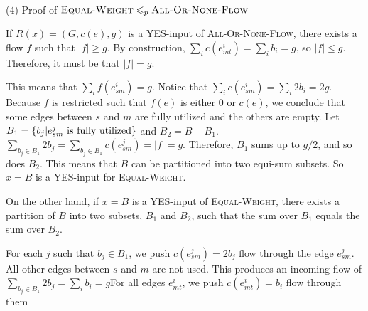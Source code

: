 \documentclass{article}
\begin{document}
~

\noindent(4) Proof of $\textsc{Equal-Weight}\leqslant_p\textsc{All-Or-None-Flow}$

If $R(x)=(G,c(e),g)$ is a YES-input of \textsc{All-Or-None-Flow}, there exists a flow $f$ such that $|f|\geqslant g$. By construction, $\sum_ic(e_{mt}^i)=\sum_ib_i=g$, so $|f|\leqslant g$. Therefore, it must be that $|f|=g$.

This means that $\sum_if(e_{sm}^i)=g$. Notice that $\sum_ic(e_{sm}^i)=\sum_i2b_i=2g$. Because $f$ is restricted such that $f(e)$ is either 0 or $c(e)$, we conclude that some edges between $s$ and $m$ are fully utilized and the others are empty. Let $B_1=\{b_j|e_{sm}^j\textup{ is fully utilized}\}$ and $B_2=B-B_1$. $\sum_{b_j\in B_1}2b_j=\sum_{b_j\in B_1}c(e_{sm}^j)=|f|=g$. Therefore, $B_1$ sums up to $g/2$, and so does $B_2$. This means that $B$ can be partitioned into two equi-sum subsets. So $x=B$ is a YES-input for \textsc{Equal-Weight}.

On the other hand, if $x=B$ is a YES-input of \textsc{Equal-Weight}, there exists a partition of $B$ into two subsets, $B_1$ and $B_2$, such that the sum over $B_1$ equals the sum over $B_2$.

For each $j$ such that $b_j\in B_1$, we push $c(e_{sm}^j)=2b_j$ flow through the edge $e_{sm}^j$. All other edges between $s$ and $m$ are not used. This produces an incoming flow of $\sum_{b_j\in B_1}2b_j=\sum_ib_i=g$For all edges $e_{mt}^i$, we push $c(e_{mt}^i)=b_i$ flow through them
\end{document}
